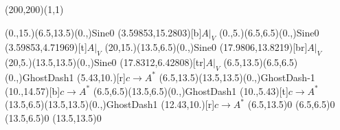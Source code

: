 \unitlength=1bp%

\begin{feynartspicture}(200,200)(1,1)

\FADiagram{}
\FAProp(0.,15.)(6.5,13.5)(0.,){Sine}{0}
\FALabel(3.59853,15.2803)[b]{$A|_V$}
\FAProp(0.,5.)(6.5,6.5)(0.,){Sine}{0}
\FALabel(3.59853,4.71969)[t]{$A|_V$}
\FAProp(20,15.)(13.5,6.5)(0.,){Sine}{0}
\FALabel(17.9806,13.8219)[br]{$A|_V$}
\FAProp(20,5.)(13.5,13.5)(0.,){Sine}{0}
\FALabel(17.8312,6.42808)[tr]{$A|_V$}
\FAProp(6.5,13.5)(6.5,6.5)(0.,){GhostDash}{1}
\FALabel(5.43,10.)[r]{$c\to A^*$}
\FAProp(6.5,13.5)(13.5,13.5)(0.,){GhostDash}{-1}
\FALabel(10.,14.57)[b]{$c\to A^*$}
\FAProp(6.5,6.5)(13.5,6.5)(0.,){GhostDash}{1}
\FALabel(10.,5.43)[t]{$c\to A^*$}
\FAProp(13.5,6.5)(13.5,13.5)(0.,){GhostDash}{1}
\FALabel(12.43,10.)[r]{$c\to A^*$}
\FAVert(6.5,13.5){0}
\FAVert(6.5,6.5){0}
\FAVert(13.5,6.5){0}
\FAVert(13.5,13.5){0}
\end{feynartspicture}

